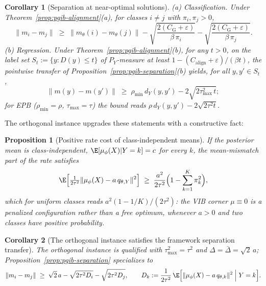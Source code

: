 \documentclass{article} %
\theoremstyle{plain}
\newtheorem{proposition}{Proposition}[section]
\newtheorem{corollary}{Corollary}[section]
\theoremstyle{remark}
\begin{document}
\begin{corollary}[Separation at near-optimal solutions]
\label{cor:pgib-alignment-separation}
\emph{(a) Classification.} Under Theorem~\ref{prop:pgib-alignment}(a), for classes
$i \ne j$ with $\pi_i, \pi_j > 0$,
\begin{equation}
\|m_i - m_j\| \;\ge\; \|m_\theta(i) - m_\theta(j)\|
- \sqrt{\frac{2(C_{\mathrm{G}} + \varepsilon)}{\beta\,\pi_i}}
- \sqrt{\frac{2(C_{\mathrm{G}} + \varepsilon)}{\beta\,\pi_j}} .
\label{eq:pgib-alignment-separation}
\end{equation}
\emph{(b) Regression.} Under Theorem~\ref{prop:pgib-alignment}(b), for any $t > 0$,
on the label set $S_t := \{ y : D(y) \le t \}$ of $P_Y$-measure at least
$1 - (C_{\mathrm{align}} + \varepsilon)/(\beta t)$, the pointwise transfer of
Proposition~\ref{prop:pgib-separation}(b) yields, for all $y, y' \in S_t$,
\begin{equation}
\|m(y) - m(y')\| \;\ge\; \rho_{\min}\, d_Y(y, y')
- 2\sqrt{2\tau^2_{\max}\, t} ;
\label{eq:pgib-alignment-regression-separation}
\end{equation}
for EPB ($\rho_{\min} = \rho$, $\tau_{\max} = \tau$) the bound reads
$\rho\, d_Y(y, y') - 2\sqrt{2\tau^2 t}$.
\end{corollary}

The orthogonal instance upgrades these statements with a constructive fact:
\begin{proposition}[Positive rate cost of class-independent means]
\label{prop:opb-collapse}
If the posterior mean is class-independent, $\E[\mu_\phi(X) | Y = k] = c$ for every
$k$, the mean-mismatch part of the rate satisfies
\begin{equation}
\E\Bigl[ \tfrac{1}{2\tau^2} \|\mu_\phi(X) - a\,q_{\theta,Y}\|^2 \Bigr]
\;\ge\; \frac{a^2}{2\tau^2}\Bigl( 1 - \sum_{k=1}^{K} \pi_k^2 \Bigr) ,
\label{eq:opb-collapse}
\end{equation}
which for uniform classes reads $a^2(1 - 1/K)/(2\tau^2)$: the VIB corner
$\mu \equiv 0$ is a penalized configuration rather than a free optimum, whenever
$a > 0$ and two classes have positive probability.
\end{proposition}

\begin{corollary}[The orthogonal instance satisfies the framework separation transfer]
\label{prop:opb-separation}
The orthogonal instance is qualified with $\tau^2_{\max} = \tau^2$ and
$\Delta = \bar\Delta = \sqrt{2}\,a$; Proposition~\ref{prop:pgib-separation}
specializes to
\begin{equation}
\|m_i - m_j\| \;\ge\; \sqrt{2}\,a
- \sqrt{2\tau^2 D_i} - \sqrt{2\tau^2 D_j} ,
\qquad
D_k := \frac{1}{2\tau^2}\,
\E\Bigl[ \|\mu_\phi(X) - a\,q_{\theta,k}\|^2 \;\Big|\; Y = k \Bigr] .
\label{eq:opb-separation}
\end{equation}
\end{corollary}
\end{document}
